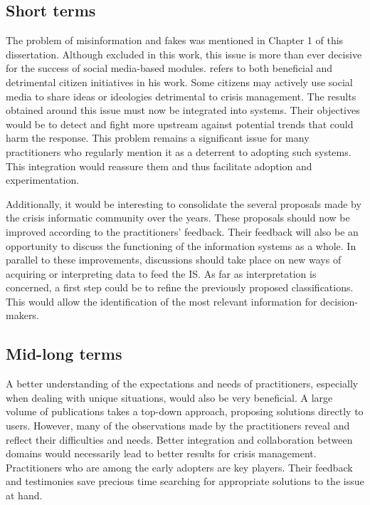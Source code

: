 \subsection*{Short terms}
The problem of misinformation and fakes was mentioned in Chapter 1 of this dissertation.
Although excluded in this work, this issue is more than ever decisive for the success of social media-based modules.
\textcite{batardIntegrerContributionsCitoyennes2021} refers to both beneficial and detrimental citizen initiatives in his work.
Some citizens may actively use social media to share ideas or ideologies detrimental to crisis management.
The results obtained around this issue must now be integrated into systems.
Their objectives would be to detect and fight more upstream against potential trends that could harm the response.
This problem remains a significant issue for many practitioners who regularly mention it as a deterrent to adopting such systems.
This integration would reassure them and thus facilitate adoption and experimentation.

Additionally, it would be interesting to consolidate the several proposals made by the crisis informatic community over the years.
These proposals should now be improved according to the practitioners' feedback.
Their feedback will also be an opportunity to discuss the functioning of the information systems as a whole.
In parallel to these improvements, discussions should take place on new ways of acquiring or interpreting data to feed the IS.
As far as interpretation is concerned, a first step could be to refine the previously proposed classifications.
This would allow the identification of the most relevant information for decision-makers.

\subsection*{Mid-long terms}
A better understanding of the expectations and needs of practitioners, especially when dealing with unique situations, would also be very beneficial.
A large volume of publications takes a top-down approach, proposing solutions directly to users.
However, many of the observations made by the practitioners reveal and reflect their difficulties and needs.
Better integration and collaboration between domains would necessarily lead to better results for crisis management.
Practitioners who are among the early adopters are key players.
Their feedback and testimonies save precious time searching for appropriate solutions to the issue at hand.

